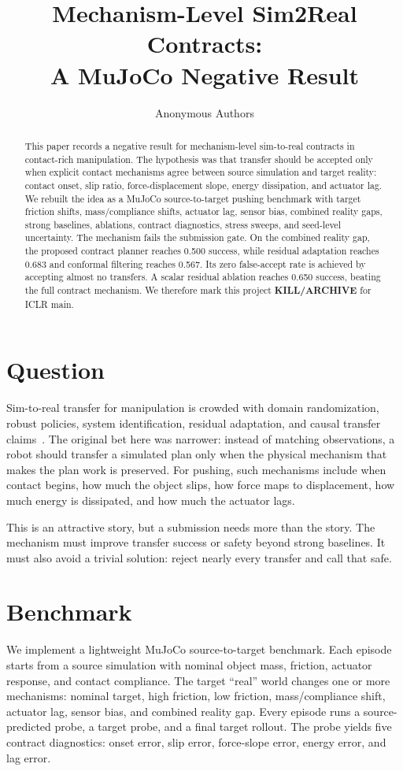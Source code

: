 \documentclass{article}
\title{Mechanism-Level Sim2Real Contracts:\\A MuJoCo Negative Result}
\author{Anonymous Authors}
\begin{document}
\maketitle

\begin{abstract}
This paper records a negative result for mechanism-level sim-to-real contracts in contact-rich manipulation.
The hypothesis was that transfer should be accepted only when explicit contact mechanisms agree between source simulation and target reality: contact onset, slip ratio, force-displacement slope, energy dissipation, and actuator lag.
We rebuilt the idea as a MuJoCo source-to-target pushing benchmark with target friction shifts, mass/compliance shifts, actuator lag, sensor bias, combined reality gaps, strong baselines, ablations, contract diagnostics, stress sweeps, and seed-level uncertainty.
The mechanism fails the submission gate.
On the combined reality gap, the proposed contract planner reaches 0.500 success, while residual adaptation reaches 0.683 and conformal filtering reaches 0.567.
Its zero false-accept rate is achieved by accepting almost no transfers.
A scalar residual ablation reaches 0.650 success, beating the full contract mechanism.
We therefore mark this project \textbf{KILL/ARCHIVE} for ICLR main.
\end{abstract}

\section{Question}
Sim-to-real transfer for manipulation is crowded with domain randomization, robust policies, system identification, residual adaptation, and causal transfer claims~\citep{prior1,prior3,prior4}.
The original bet here was narrower: instead of matching observations, a robot should transfer a simulated plan only when the physical mechanism that makes the plan work is preserved.
For pushing, such mechanisms include when contact begins, how much the object slips, how force maps to displacement, how much energy is dissipated, and how much the actuator lags.

This is an attractive story, but a submission needs more than the story.
The mechanism must improve transfer success or safety beyond strong baselines.
It must also avoid a trivial solution: reject nearly every transfer and call that safe.

\section{Benchmark}
We implement a lightweight MuJoCo source-to-target benchmark.
Each episode starts from a source simulation with nominal object mass, friction, actuator response, and contact compliance.
The target ``real'' world changes one or more mechanisms: nominal target, high friction, low friction, mass/compliance shift, actuator lag, sensor bias, and combined reality gap.
Every episode runs a source-predicted probe, a target probe, and a final target rollout.
The probe yields five contract diagnostics: onset error, slip error, force-slope error, energy error, and lag error.
\end{document}
